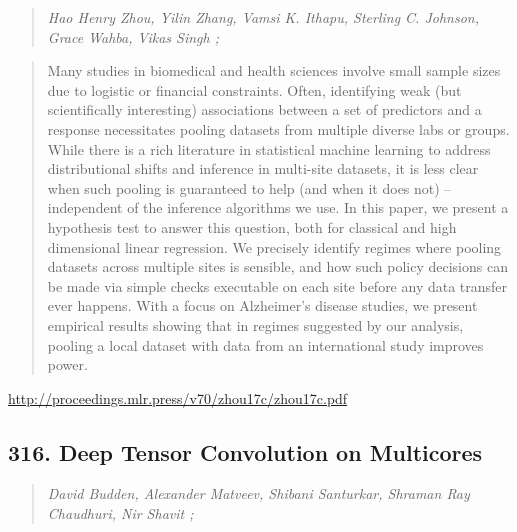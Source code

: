\documentclass{article}
\begin{document}
\begin{quote}
\footnotesize{\textit{Hao Henry Zhou, Yilin Zhang, Vamsi K. Ithapu, Sterling C. Johnson, Grace Wahba, Vikas Singh ;}}

\end{quote}

\begin{quote}
    Many studies in biomedical and health sciences involve small sample sizes due to logistic or financial constraints. Often, identifying weak (but scientifically interesting) associations between a set of predictors and a response necessitates pooling datasets from multiple diverse labs or groups. While there is a rich literature in statistical machine learning to address distributional shifts and inference in multi-site datasets, it is less clear when such pooling is guaranteed to help (and when it does not) – independent of the inference algorithms we use. In this paper, we present a hypothesis test to answer this question, both for classical and high dimensional linear regression. We precisely identify regimes where pooling datasets across multiple sites is sensible, and how such policy decisions can be made via simple checks executable on each site before any data transfer ever happens. With a focus on Alzheimer’s disease studies, we present empirical results showing that in regimes suggested by our analysis, pooling a local dataset with data from an international study improves power.  
\end{quote}

\href{http://proceedings.mlr.press/v70/zhou17c/zhou17c.pdf}{http://proceedings.mlr.press/v70/zhou17c/zhou17c.pdf}

\subsection{316. Deep Tensor Convolution on Multicores}

\begin{quote}
\footnotesize{\textit{David Budden, Alexander Matveev, Shibani Santurkar, Shraman Ray Chaudhuri, Nir Shavit ;}}

\end{quote}
\end{document}
